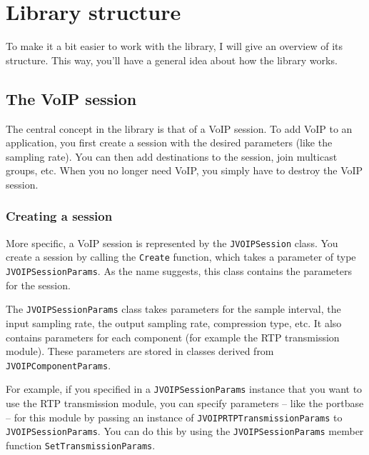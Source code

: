 \chapter{Library structure}

	To make it a bit easier to work with the library, I will give an overview
	of its structure. This way, you'll have a general idea about how the
	library works.
	
	\section{The VoIP session}
	
	The central concept in the library is that of a VoIP session. To add VoIP
	to an application, you first create a session with the desired parameters
	(like the sampling rate). You can then add destinations to the session,
	join multicast groups, etc. When you no longer need VoIP, you simply have
	to destroy the VoIP session.
	
		\subsection{Creating a session}
		
		More specific, a VoIP session is represented by the {\tt JVOIPSession} class.
		You create a session by calling the {\tt Create} function, which takes a
		parameter of type {\tt JVOIPSessionParams}. As the name suggests, this class
		contains the parameters for the session.
		
		The {\tt JVOIPSessionParams} class takes parameters for the sample interval, the
		input sampling rate, the output sampling rate, compression type, etc. It
		also contains parameters for each component (for example the RTP
		transmission module). These parameters are stored in classes derived from
		{\tt JVOIPComponentParams}.
		
		For example, if you specified in a {\tt JVOIPSessionParams} instance that you
		want to use the RTP transmission module, you can specify parameters --
		like the portbase -- for this module by passing an instance of
		{\tt JVOIPRTP\-Trans\-mis\-sion\-Params} to {\tt JVOIPSessionParams}. You can do this by using
		the {\tt JVOIPSessionParams} member function {\tt Set\-Trans\-mis\-sion\-Params}.
		
